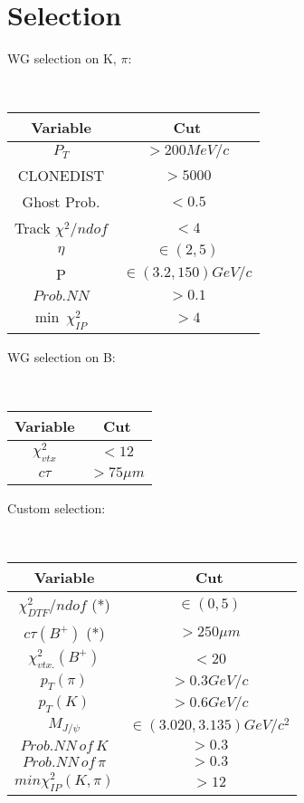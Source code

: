 \section{Selection}



WG selection on K, $\pi$:

\vspace*{0.5cm}
\mbox{~}
\begin{tabular}{|c|c|}
\hline
Variable & Cut \\
\hline

$P_{T}$ & $> 200 MeV/c$ \\
CLONEDIST  & $> 5000$ \\
Ghost Prob. & $< 0.5$ \\
Track $\chi^{2}/ndof$ & $< 4$ \\
$\eta$ & $\in (2, 5)$ \\
P & $\in (3.2,150) GeV/c$\\
$Prob. NN$ & $> 0.1$\\
min $\,\chi^{2}_{IP}$ & $> 4$\\

\hline
\end{tabular}
\vspace*{0.5cm}

WG selection on B:

\vspace*{0.5cm}
\mbox{~}
\begin{tabular}{|c|c|}
\hline
Variable & Cut \\
\hline
$\chi^{2}_{vtx}$ & $< 12$ \\
$c\tau$ & $> 75 \mu m$ \\

\hline
\end{tabular}
\vspace*{0.5cm}

Custom selection:

\vspace*{0.5cm}
\mbox{~}
\begin{tabular}{|c|c|}
\hline
Variable & Cut \\
\hline
$\chi^{2}_{DTF} / ndof$ (*) & $\in (0, 5)$ \\
$c\tau(B^{+})$ (*) & $> 250 \mu m$ \\
$\chi^{2}_{vtx.}(B^{+})$ & $< 20$ \\
$p_{T}(\pi)$ & $> 0.3 GeV/c$ \\
$p_{T}(K)$ & $> 0.6 GeV/c$ \\
$M_{J/\psi}$ & $\in (3.020, 3.135) GeV/c^2$ \\
$Prob.NN\,of\,K$ & $> 0.3$ \\
$Prob.NN\,of\,\pi$ & $> 0.3$ \\
$min \chi^{2}_{IP}(K, \pi)$ & $> 12$ \\
\hline
\end{tabular}
\vspace*{0.5cm}


